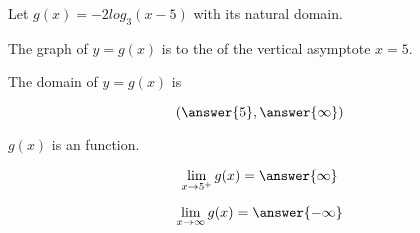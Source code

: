 \documentclass{ximera}
\author{Lee Wayand}
\begin{document}
\begin{exercise}






Let $g(x) = -2 log_3(x-5)$ with its natural domain. \\





\begin{question}


The graph of $y = g(x)$ is to the  of the vertical asymptote $x = 5$.


\end{question}





\begin{question}


The domain of $y = g(x)$ is 

\[
\left( \answer{5}, \answer{\infty} \right)
\]


\end{question}






\begin{question}


$g(x)$ is an  function.


\end{question}











\begin{question}


\[
\lim\limits_{x \to 5^+} g(x) = \answer{\infty}
\]


\end{question}








\begin{question}


\[
\lim\limits_{x \to \infty} g(x) = \answer{-\infty}
\]


\end{question}










\end{exercise}
\end{document}
